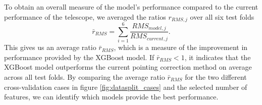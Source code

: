 To obtain an overall measure of the model's performance compared to the current performance of the telescope, we averaged the ratios $r_{RMS,j}$ over all six test folds
\begin{equation}
    \bar{r}_{RMS} = \sum_{i=1}^6 \frac{RMS_{model,j}}{RMS_{current,j}}.
\end{equation}
This gives us an average ratio $\bar{r}_{RMS}$, which is a measure of the improvement in performance provided by the XGBoost model.
If $\bar{r}_{RMS} < 1$, it indicates that the XGBoost model outperforms the current pointing correction method on average across all test folds.
By comparing the average ratio $\bar{r}_{RMS}$ for the two different cross-validation cases in figure \ref{fig:datasplit_cases} and the selected number of features,
we can identify which models provide the best performance.
